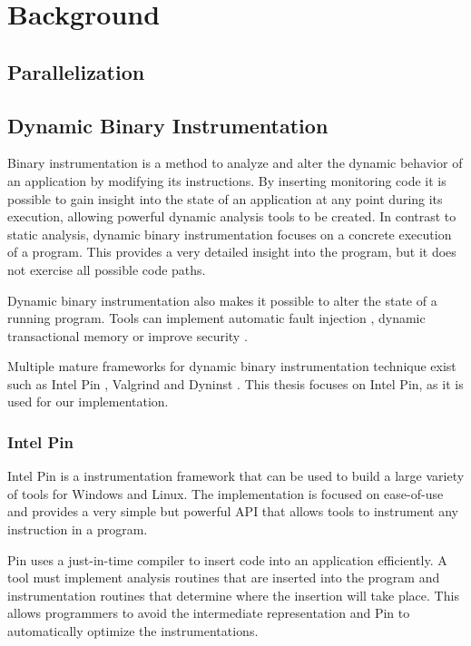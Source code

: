 \chapter{Background}

\section {Parallelization}

\section {Dynamic Binary Instrumentation}

Binary instrumentation is a method to analyze and alter the dynamic behavior of an application by modifying its instructions. By inserting monitoring code it is possible to gain insight into the state of an application at any point during its execution, allowing powerful dynamic analysis tools to be created. In contrast to static analysis, dynamic binary instrumentation focuses on a concrete execution of a program. This provides a very detailed insight into the program, but it does not exercise all possible code paths.

Dynamic binary instrumentation also makes it possible to alter the state of a running program. Tools can implement automatic fault injection \cite{faultinject}, dynamic transactional memory \cite{dynamicstm} or improve security \cite{dynamicstackprotect}.

Multiple mature frameworks for dynamic binary instrumentation technique exist such as Intel Pin \cite{pin}, Valgrind \cite{valgrind} and Dyninst \cite{dyninst}. This thesis focuses on Intel Pin, as it is used for our implementation.

\subsection{Intel Pin}

Intel Pin \cite{pin} is a instrumentation framework that can be used to build a large variety of tools for Windows and Linux. The implementation is focused on ease-of-use and provides a very simple but powerful API that allows tools to instrument any instruction in a program.

Pin uses a just-in-time compiler to insert code into an application efficiently. A tool must implement analysis routines that are inserted into the program and instrumentation routines that determine where the insertion will take place. This allows programmers to avoid the intermediate representation and Pin to automatically optimize the instrumentations.

